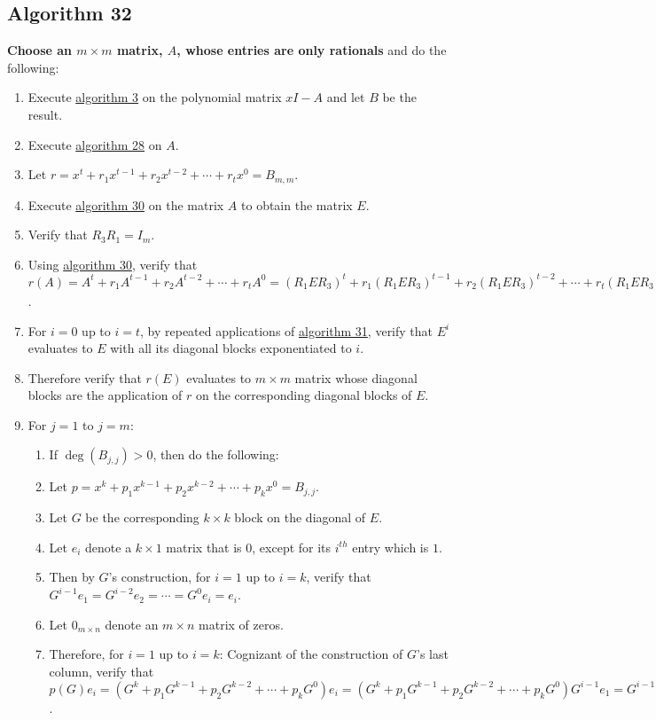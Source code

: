 \documentclass[twocolumn]{article}
\begin{document}
		\subsection{Algorithm 32}\label{sec:algorithm 32}
			\textbf{Choose an $m\times m$ matrix, $A$, whose entries are only rationals} and do the following:
			\begin{enumerate}
				\item Execute \hyperref[sec:algorithm 3]{algorithm 3} on the polynomial matrix $xI-A$ and let $B$ be the result.
				\item Execute \hyperref[sec:algorithm 28]{algorithm 28} on $A$.
				\item Let $r=x^t+r_1x^{t-1}+r_2x^{t-2}+\cdots+r_tx^0=B_{m,m}$.
				\item Execute \hyperref[sec:algorithm 30]{algorithm 30} on the matrix $A$ to obtain the matrix $E$.
				\item Verify that $R_3R_1=I_m$.
				\item Using \hyperref[sec:algorithm 30]{algorithm 30}, verify that $r(A)=A^t+r_1A^{t-1}+r_2A^{t-2}+\cdots+r_tA^0=(R_1ER_3)^t+r_1(R_1ER_3)^{t-1}+r_2(R_1ER_3)^{t-2}+\cdots+r_t(R_1ER_3)^0=R_1(E^t+r_1E^{t-1}+r_2E^{t-2}+\cdots+r_tE^0)R_3=R_1r(E)R_3$.
				\item For $i=0$ up to $i=t$, by repeated applications of \hyperref[sec:algorithm 31]{algorithm 31}, verify that $E^i$ evaluates to $E$ with all its diagonal blocks exponentiated to $i$.
				\item Therefore verify that $r(E)$ evaluates to $m\times m$ matrix whose diagonal blocks are the application of $r$ on the corresponding diagonal blocks of $E$.
				\item For $j=1$ to $j=m$:
				\begin{enumerate}
					\item If $\deg(B_{j,j})>0$, then do the following:
					\item Let $p=x^k+p_1x^{k-1}+p_2x^{k-2}+\cdots+p_kx^0=B_{j,j}$.
					\item Let $G$ be the corresponding $k\times k$ block on the diagonal of $E$.
					\item Let $e_i$ denote a $k\times 1$ matrix that is $0$, except for its $i^{th}$ entry which is $1$.
					\item Then by $G$'s construction, for $i=1$ up to $i=k$, verify that $G^{i-1}e_1=G^{i-2}e_2=\cdots=G^{0}e_i=e_i$.
					\item Let $0_{m\times n}$ denote an $m\times n$ matrix of zeros.
					\item Therefore, for $i=1$ up to $i=k$: Cognizant of the construction of $G$'s last column, verify that $p(G)e_i=(G^k+p_1G^{k-1}+p_2G^{k-2}+\cdots+p_kG^0)e_i=(G^k+p_1G^{k-1}+p_2G^{k-2}+\cdots+p_kG^0)G^{i-1}e_1=G^{i-1}(GG^{k-1}+p_1G^{k-1}+p_2G^{k-2}+\cdots+p_kG^0)e_1=G^{i-1}(Ge_k+p_1e_k+p_2e_{k-1}+\cdots+p_ke_1)=G^{i-1}0_{k\times 1}=0_{k\times 1}$.

\end{enumerate}
\end{enumerate}
\end{document}
